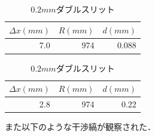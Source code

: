 \documentclass[11pt, a4paper]{jsarticle}
\begin{document}
\begin{table}[htb]
 \begin{minipage}{0.45\hsize}
  \begin{center}
    \caption{$0.1mm$ダブルスリット}
    \begin{tabular}{rrr} \hline
        $\Delta x(mm)$ & $R(mm)$ & $d(mm)$  \\ \hline
        7.0    & 974 & 0.088\\ \hline
    \end{tabular}
    \label{tab:f}
  \end{center}
 \end{minipage}
 \begin{minipage}{0.45\hsize}
  \begin{center}
    \caption{$0.2mm$ダブルスリット}
    \begin{tabular}{rrr} \hline
        $\Delta x(mm)$ & $R(mm)$ & $d(mm)$  \\ \hline
        2.8    & 974 & 0.22\\ \hline
    \end{tabular}
    \label{tab:g}
  \end{center}
 \end{minipage}
\end{table}

また以下のような干渉縞が観察された．
\end{document}
